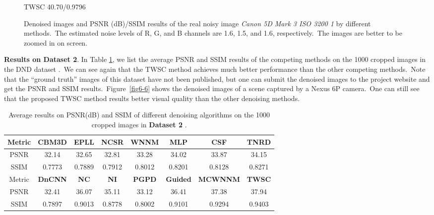 \begin{figure}
{\begin{minipage}[t]{0.24\textwidth}
{\footnotesize TWSC 40.70/0.9796}
\end{minipage}
}
    \caption{Denoised images and PSNR (dB)/SSIM results of the real noisy image \textsl{Canon 5D Mark 3 ISO 3200 1} \cite{crosschannel2016} by different methods.\ The estimated noise levels of R, G, and B channels are 1.6, 1.5, and 1.6, respectively.\ The images are better to be zoomed in on screen.}
    \label{fig6-5}
\end{figure}

\textbf{Results on Dataset 2}. In Table \ref{tab6-7}, we list the average PSNR and SSIM results of the competing methods on the 1000 cropped images in the DND dataset \cite{dnd2017}.\ We can see again that the TWSC method achieves much better performance than the other competing methods.\ Note that the ``ground truth'' images of this dataset have not been published, but one can submit the denoised images to the project website and get the PSNR and SSIM results.\ Figure\ \ref{fig6-6} shows the denoised images of a scene captured by a Nexus 6P camera.\ One can still see that the proposed TWSC method results better visual quality than the other denoising methods.

\begin{table}[hbp]
\caption{Average results on PSNR(dB) and SSIM of different denoising algorithms on the 1000 cropped images in \textbf{Dataset 2} \cite{dnd2017}.}
\scriptsize
\label{tab6-7}
\begin{center}
\renewcommand\arraystretch{1.2}
\begin{tabular*}{1\textwidth}{@{\extracolsep{\fill}}cccccccc}
\hline
Metric
&
\textbf{CBM3D}
&
\textbf{EPLL}
&
\textbf{NCSR}
&
\textbf{WNNM}
&
\textbf{MLP}
&
\textbf{CSF}
&
\textbf{TNRD}
\\
\hline
PSNR & 32.14 &  32.65 & 32.81 & 33.28  & 34.02  & 33.87  & 34.15
\\
\hline
SSIM & 0.7773 & 0.7889  & 0.7912  & 0.8012  &  0.8201 & 0.8128  & 0.8271
\\
\hline
Metric

&
\textbf{DnCNN}
&
\textbf{NC}
&
\textbf{NI}
&
\textbf{PGPD}
&
\textbf{Guided}
&
\textbf{MCWNNM}
&
\textbf{TWSC}
\\
\hline
PSNR & 32.41 & 36.07 & 35.11 & 33.12 & 36.41 & 37.38 &  37.94
\\
\hline
SSIM & 0.7897 & 0.9013 & 0.8778 & 0.8002 & 0.9101 & 0.9294 &  0.9403
\\
\hline
\end{tabular*}
\end{center}
\end{table}


